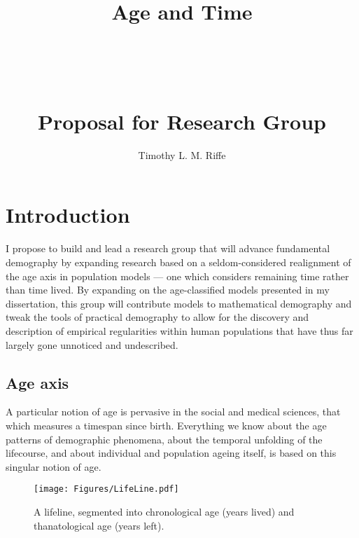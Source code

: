 \documentclass[a4paper,12pt]{article}
\begin{document}
\title{\vspace{-15mm}
\fontsize{25pt}{10pt}\selectfont
\textbf{
\hfill
\Huge{Age} \huge{and} \Huge{Time} \hfill\hfill 
} \\ ~ \\~ \\~ \\ \huge{Proposal for Research Group}}
\author{Timothy L. M. Riffe}
\maketitle

\onehalfspacing

\section{Introduction}
I propose to build and lead a research group that will advance fundamental
demography by expanding research based on a seldom-considered realignment of
the age axis in population models --- one which considers remaining time rather
than time lived.
By expanding on the age-classified models presented in my dissertation, this group will contribute models to
mathematical demography and tweak the tools of practical demography to allow for
the discovery and description of empirical regularities within human populations
that have thus far largely gone unnoticed and undescribed.

\subsection{Age axis}
A particular notion of age is pervasive in the social and medical sciences, that
which measures a timespan since birth.
Everything we know about the age patterns of demographic phenomena, about the temporal
unfolding of the lifecourse, and about individual and population ageing itself,
is based on this singular notion of age. 

\begin{figure}[h]
\centering
	\caption{A lifeline, segmented into chronological age (years lived) and
	thanatological age (years left).}
	\label{fig:line}
	\texttt{[image: Figures/LifeLine.pdf]}	
\end{figure}
\end{document}
